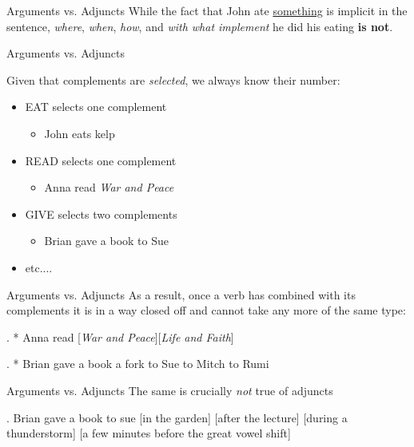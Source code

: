 \begin{frame}
 {Arguments vs. Adjuncts} 
While the fact that John ate \underline{something} is implicit in the sentence, \textit{where}, \textit{when}, \textit{how}, and \textit{with what implement} he did his eating \textbf{is not}.

\end{frame}

\begin{frame}
 {Arguments vs. Adjuncts}

Given that complements are \textit{selected}, we always know their number:

\begin{itemize}
\item EAT selects one complement
  \begin{itemize}
  \item John eats kelp
  \end{itemize}
\item READ selects one complement
  \begin{itemize}
  \item Anna read \textit{War and Peace} 
  \end{itemize}
\item GIVE selects two complements
  \begin{itemize}
  \item Brian gave a book to Sue
  \end{itemize}
\item etc....
\end{itemize}
\end{frame}

\begin{frame}
  {Arguments vs. Adjuncts}
As a result, once a verb has combined with its complements it is in a way closed off and cannot take any more of the same type:

\ex.
* Anna read [\textit{War and Peace}][\textit{Life and Faith}] 

\ex.
* Brian gave a book a fork to Sue to Mitch to Rumi


\end{frame}

\begin{frame}
  {Arguments vs. Adjuncts}
The same is crucially \textit{not} true of adjuncts

\ex.
Brian gave a book to sue [in the garden] [after the lecture] [during a thunderstorm] [a few minutes before the great vowel shift] 


\end{frame}


